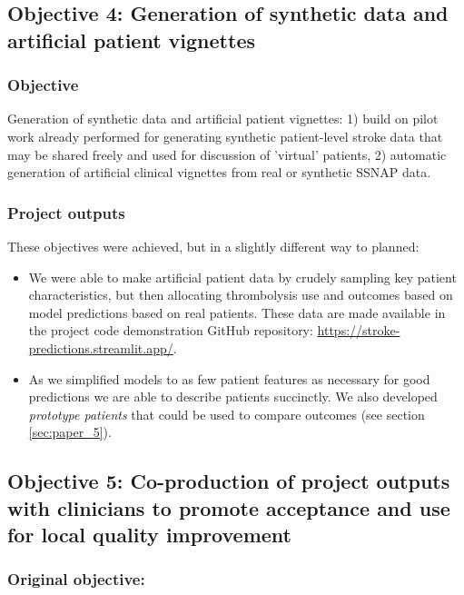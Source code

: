 \subsection{Objective 4: Generation of synthetic data and artificial patient vignettes}

\subsubsection*{Objective}

Generation of synthetic data and artificial patient vignettes: 1) build on pilot work already performed for generating synthetic patient-level stroke data that may be shared freely and used for discussion of ’virtual’ patients, 2) automatic generation of artificial clinical vignettes from real or synthetic SSNAP data.

\subsubsection*{Project outputs}

These objectives were achieved, but in a slightly different way to planned:

\begin{itemize}
    \item We were able to make artificial patient data by crudely sampling key patient characteristics, but then allocating thrombolysis use and outcomes based on model predictions based on real patients. These data are made available in the project code demonstration GitHub repository: \url{https://stroke-predictions.streamlit.app/}.
    \item As we simplified models to as few patient features as necessary for good predictions we are able to describe patients succinctly. We also developed \textit{prototype patients} that could be used to compare outcomes (see section \ref{sec:paper_5}).    
\end{itemize}



\subsection{Objective 5: Co-production of project outputs with clinicians to promote acceptance and use for local quality improvement}

\subsubsection*{Original objective:}

